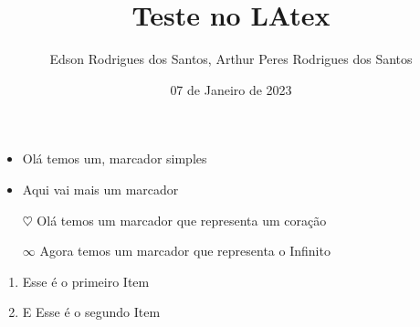 \documentclass[12pt,a4paper,brazil,oneside]{book}
\title{Teste no LAtex}
\author{Edson Rodrigues dos Santos, Arthur Peres Rodrigues dos Santos}
\date{07 de Janeiro de 2023}
\begin{document}
\maketitle\newpage

\begin{itemize}
 \item Olá temos um, marcador 
 simples
 \item Aqui vai mais um marcador
 
\end{itemize}

\begin{itemize}
	\item[$\heartsuit$] Olá temos um marcador que representa um coração 
	\item[$\infty$] Agora temos um marcador que representa o Infinito
\end{itemize}

\begin{enumerate}
	\item Esse é o {primeiro} Item
	\item E Esse é o {segundo} Item
\end{enumerate}
\end{document}
